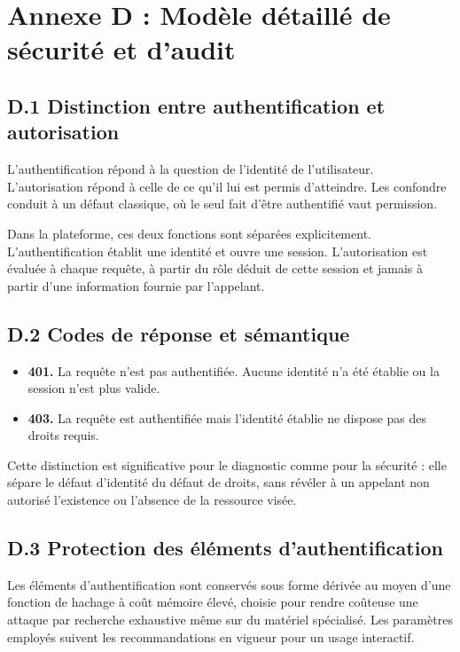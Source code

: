 \newpage

\chapter*{Annexe D : Modèle détaillé de sécurité et d'audit}

\section*{D.1 Distinction entre authentification et autorisation}

L'authentification répond à la question de l'identité de l'utilisateur. L'autorisation répond à celle de ce qu'il lui est permis d'atteindre. Les confondre conduit à un défaut classique, où le seul fait d'être authentifié vaut permission.

Dans la plateforme, ces deux fonctions sont séparées explicitement. L'authentification établit une identité et ouvre une session. L'autorisation est évaluée à chaque requête, à partir du rôle déduit de cette session et jamais à partir d'une information fournie par l'appelant.

\section*{D.2 Codes de réponse et sémantique}

\begin{itemize}
  \item \textbf{401.} La requête n'est pas authentifiée. Aucune identité n'a été établie ou la session n'est plus valide.
  \item \textbf{403.} La requête est authentifiée mais l'identité établie ne dispose pas des droits requis.
\end{itemize}

Cette distinction est significative pour le diagnostic comme pour la sécurité : elle sépare le défaut d'identité du défaut de droits, sans révéler à un appelant non autorisé l'existence ou l'absence de la ressource visée.

\section*{D.3 Protection des éléments d'authentification}

Les éléments d'authentification sont conservés sous forme dérivée au moyen d'une fonction de hachage à coût mémoire élevé, choisie pour rendre coûteuse une attaque par recherche exhaustive même sur du matériel spécialisé. Les paramètres employés suivent les recommandations en vigueur pour un usage interactif.

